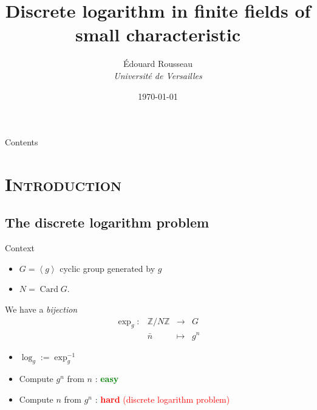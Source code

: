 \documentclass[xcolor=x11names,compress]{beamer}
\theoremstyle{break}
\theoremstyle{sc}
\theoremstyle{definition}
\theoremstyle{remark}
\DeclareMathOperator{\Card}{Card}
\begin{document}
\begin{frame}
  \title{Discrete logarithm in finite fields of small characteristic}
\author{
Édouard Rousseau\\
{\it Université de Versailles\\}
}
\date{\today}
\titlepage
\end{frame}

\begin{frame}{Contents}
\tableofcontents
\end{frame}

\section{\scshape Introduction}
\subsection{The discrete logarithm problem}
\begin{frame}{Context}
  \begin{itemize}
    \item $G=\left\langle g \right\rangle$ cyclic group generated by $g$
    \item $N=\Card G$.
    \end{itemize}
  
  We have a \emph{bijection}
  \[
    \begin{array}{cccc}
      \exp_g: & \mathbb{Z}/N\mathbb{Z} & \to & G \\
      & \bar n & \mapsto & g^n
    \end{array}
  \]

  \begin{itemize}
    \item $\log_g:=\exp_g^{-1}$
   \item Compute $g^n$ from $n$ : \textcolor{green}{\bf easy}
    \item Compute $n$ from $g^n$ : \textcolor{red}{\textbf{hard} (discrete
    logarithm problem)}
  \end{itemize}
\end{frame}
\end{document}
